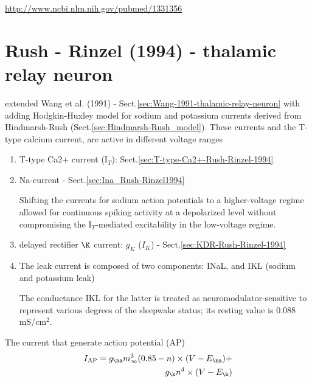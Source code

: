 \url{http://www.ncbi.nlm.nih.gov/pubmed/1331356}

\section{Rush - Rinzel (1994) - thalamic relay neuron}
\label{sec:Rush-Rinzel-1994}

\citep{rush1994} extended Wang et al. (1991) -
Sect.\ref{sec:Wang-1991-thalamic-relay-neuron} with adding Hodgkin-Huxley model
for sodium and potassium currents derived from Hindmarsh-Rush
(Sect.\ref{sec:Hindmarsh-Rush_model}).
These currents and the T-type calcium current, are active in different voltage ranges
\begin{enumerate}
  \item T-type Ca2+ current (I$_T$): Sect.\ref{sec:T-type-Ca2+-Rush-Rinzel-1994} 

  \item Na-current - Sect.\ref{sec:Ina_Rush-Rinzel1994}

Shifting the currents for sodium action potentials to a higher-voltage regime
allowed for continuous spiking activity at a depolarized level without
compromising the I$_T$-mediated excitability in the low-voltage regime.
   
  \item delayed rectifier $\K$ current: $g_K$ ($I_K$) -
  Sect.\ref{sec:KDR-Rush-Rinzel-1994}
  
  \item The leak current is composed of two components: INaL, and IKL (sodium
  and potassium leak)

The conductance IKL for the latter is treated as neuromodulator-sensitive to
represent various degrees of the sleepwake status; its resting value is 0.088 mS/cm$^2$.
\end{enumerate}

The current that generate action potential (AP)
\def\AP{{\text{AP}}}
\begin{equation}
\begin{split}
I_\AP = g_\na m_{\infty}^3 (0.85 - n) \times (V - E_\na) + \\
       g_\k n^4 \times (V - E_\k)
\end{split}
\end{equation}

